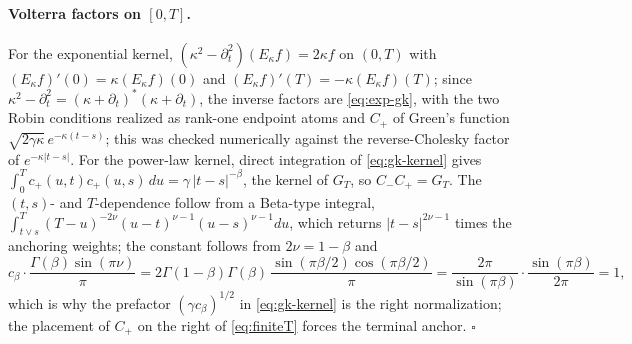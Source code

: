 \documentclass[11pt]{article}
\theoremstyle{plain}
\theoremstyle{definition}
\theoremstyle{remark}
\begin{document}
\paragraph{Volterra factors on $[0,T]$.} For the exponential kernel, $(\kappa^2-\partial_t^2)(E_\kappa f)=2\kappa f$ on $(0,T)$ with $(E_\kappa f)'(0)=\kappa(E_\kappa f)(0)$ and $(E_\kappa f)'(T)=-\kappa(E_\kappa f)(T)$; since $\kappa^2-\partial_t^2=(\kappa+\partial_t)^\ast(\kappa+\partial_t)$, the inverse factors are \eqref{eq:exp-gk}, with the two Robin conditions realized as rank-one endpoint atoms and $C_+$ of Green's function $\sqrt{2\gamma\kappa}\,e^{-\kappa(t-s)}$; this was checked numerically against the reverse-Cholesky factor of $e^{-\kappa|t-s|}$. For the power-law kernel, direct integration of \eqref{eq:gk-kernel} gives $\int_0^T c_+(u,t)c_+(u,s)\,du=\gamma\,|t-s|^{-\beta}$, the kernel of $G_T$, so $C_-C_+=G_T$. The $(t,s)$- and $T$-dependence follow from a Beta-type integral, $\int_{t\vee s}^{T}(T-u)^{-2\nu}(u-t)^{\nu-1}(u-s)^{\nu-1}du$, which returns $|t-s|^{2\nu-1}$ times the anchoring weights; the constant follows from $2\nu=1-\beta$ and
\[
c_\beta\cdot\frac{\Gamma(\beta)\sin(\pi\nu)}{\pi}
= 2\Gamma(1-\beta)\Gamma(\beta)\,\frac{\sin(\pi\beta/2)\cos(\pi\beta/2)}{\pi}
= \frac{2\pi}{\sin(\pi\beta)}\cdot\frac{\sin(\pi\beta)}{2\pi}=1 ,
\]
which is why the prefactor $(\gamma c_\beta)^{1/2}$ in \eqref{eq:gk-kernel} is the right normalization; the placement of $C_+$ on the right of \eqref{eq:finiteT} forces the terminal anchor. $\square$




\end{document}
